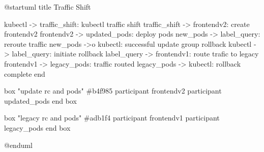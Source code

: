@startuml
title Traffic Shift

kubectl -> traffic_shift: kubectl traffic shift
traffic_shift -> frontendv2: create frontendv2
frontendv2 -> updated_pods: deploy pods
new_pods -> label_query: reroute traffic
new_pods ->o kubectl: successful update
group rollback
  kubectl -> label_query: initiate rollback
  label_query -> frontendv1: route trafic to legacy
  frontendv1 -> legacy_pods: traffic routed
  legacy_pods -> kubectl: rollback complete
end

box "update rc and pods" #b4f985
  participant frontendv2
  participant updated_pods
end box

box "legacy rc and pods" #adb1f4
  participant frontendv1
  participant legacy_pods
end box

@enduml
